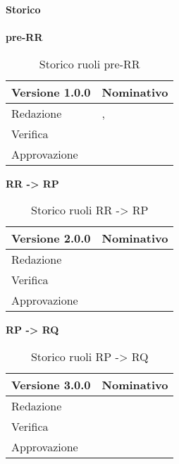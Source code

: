 \newpage
\Large{\textbf{Storico }}\\
\normalsize \\

\textbf{pre-RR}
\label{tabVers1}
\begin{table}[h]
	\begin{tabular}{p{} p{}}
		\toprule \textbf{Versione 1.0.0}	&	\textbf{Nominativo}\\
		\midrule Redazione	& \FM, \PM\\
		\midrule Verifica &	\GP\\
		\midrule Approvazione	& \TP\\
		\bottomrule
	\end{tabular}
	\caption{Storico ruoli pre-RR}
\end{table}

\textbf{RR -> RP}
\label{tabVers2}
\begin{table}[h]
	\begin{tabular}{p{} p{}}
		\toprule \textbf{Versione 2.0.0}	&	\textbf{Nominativo}\\
		\midrule Redazione	& \VG\\
		\midrule Verifica &	\GP\\
		\midrule Approvazione	& \PM\\
		\bottomrule
	\end{tabular}
	\caption{Storico ruoli RR -> RP}
\end{table}


\textbf{RP -> RQ}
\label{tabVers3}
\begin{table}[h]
	\begin{tabular}{p{} p{}}
		\toprule \textbf{Versione 3.0.0}	&	\textbf{Nominativo}\\
		\midrule Redazione	& \VG\\
		\midrule Verifica &	\GP\\
		\midrule Approvazione	& \PM\\
		\bottomrule
	\end{tabular}
	\caption{Storico ruoli RP -> RQ}
\end{table}
